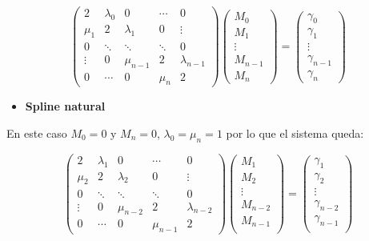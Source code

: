 \documentclass[11pt,spanish,]{article}
\theoremstyle{definition} \newtheorem*{definicion}{Definición}
\begin{document}
\[
\begin{pmatrix}
  2        & \lambda_0 &    0       &   \cdots  &     0          \\
  \mu_1  & 2            & \lambda_1  &   0       &    \vdots      \\
  0      & \ddots    & \ddots     &  \ddots   &     0          \\
  \vdots &     0     & \mu_{n-1}  &    2      & \lambda_{n-1}  \\
  0      &   \cdots  &     0      &   \mu_n   &     2
\end{pmatrix}
\begin{pmatrix}
  M_0 \\
  M_1 \\
  \vdots \\
  M_{n-1} \\
  M_n
\end{pmatrix} =
\begin{pmatrix}
  \gamma_0 \\
  \gamma_1 \\
  \vdots \\
  \gamma_{n-1} \\
  \gamma_n
\end{pmatrix}\]

\vspace*{2\baselineskip}

\begin{itemize}
\itemsep1pt\parskip0pt
\item
  \textbf{Spline natural}
\end{itemize}

En este caso $M_0=0$ y $M_n=0$, $\lambda_0 = \mu_n = 1$ por lo que el
sistema queda:

\[\begin{pmatrix}
   2        & \lambda_1  &   0       &    \cdots     & 0 \\
  \mu_2     & 2          &  \lambda_2   &     0         & \vdots\\
  0         & \ddots     &  \ddots   &     \ddots    & 0 \\
  \vdots    &    0       & \mu_{n-2} &     2         &  \lambda_{n-2}\\
  0         &  \cdots    &    0      &    \mu_{n-1}  & 2
\end{pmatrix}
\begin{pmatrix}
  M_1 \\
  M_2 \\
  \vdots \\
  M_{n-2} \\
  M_{n-1} \\
\end{pmatrix}
=
\begin{pmatrix}
  \gamma_1 \\
  \gamma_2 \\
  \vdots \\
  \gamma_{n-2} \\
  \gamma_{n-1} \\
\end{pmatrix}\]
\end{document}
